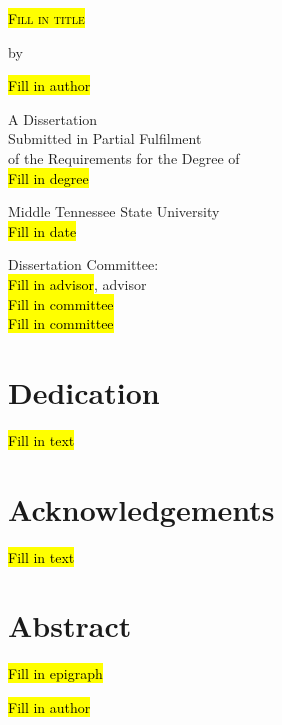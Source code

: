 \documentclass[oneside]{book}
\begin{document}
\pagestyle{fancy}
\begin{titlepage}
\begin{center}
\begin{Large}
\vspace*{1.0in}

\textsc{\hl{Fill in title}}

\vspace{0.25in}

by
\vspace{0.25in}

\hl{Fill in author}

\vfill

A Dissertation\\
Submitted in Partial Fulfilment\\
of the Requirements for the Degree of\\
\hl{Fill in degree} %
\vspace{0.5in}

Middle Tennessee State University \\
\hl{Fill in date} %
\vspace{0.5in}

Dissertation Committee:\\
\hl{Fill in advisor}, advisor\\
\hl{Fill in committee}\\
\hl{Fill in committee}\\

\end{Large}
\end{center}
\end{titlepage}

\frontmatter %
\doublespacing
\setcounter{page}{2}

\chapter*{Dedication}
\begin{center}
\hl{Fill in text}
\end{center}
\clearpage

\chapter*{Acknowledgements}
\hl{Fill in text}
\clearpage

\chapter*{Abstract}
\epigraph{\hl{Fill in epigraph}}{\hl{Fill in author}}
\end{document}

